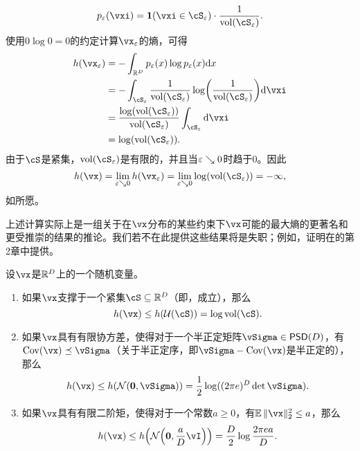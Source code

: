 \documentclass[../../book-main_zh.tex]{subfiles}
\begin{document}
\begin{equation}
    p_{\eps}(\vxi) = \indvar(\vxi \in \cS_{\eps}) \cdot \frac{1}{\volume(\cS_{\eps})}.
\end{equation}
使用\(0 \log 0 = 0\)的约定计算\(\vx_{\eps}\)的熵，可得
\begin{align}
    h(\vx_{\eps}) 
    &= -\int_{\R^{D}}p_{\eps}(x)\log p_{\eps}(x)\odif{x} \\ 
    &= -\int_{\cS_{\eps}}\frac{1}{\volume(\cS_{\eps})} \log\rp{\frac{1}{\volume(\cS_{\eps})}}\odif{\vxi} \\ 
    &= \frac{\log(\volume(\cS_{\eps}))}{\volume(\cS_{\eps})}\int_{\cS_{\eps}}\odif{\vxi} \\ 
    &= \log(\volume(\cS_{\eps})).
\end{align}
由于\(\cS\)是紧集，\(\volume(\cS_{\eps})\)是有限的，并且当\(\varepsilon \searrow 0\)时趋于\(0\)。因此
\begin{equation}
    h(\vx) = \lim_{\eps \searrow 0}h(\vx_{\eps}) = \lim_{\eps \searrow 0}\log(\volume(\cS_{\eps})) = -\infty,
\end{equation}
如所愿。

上述计算实际上是一组关于在\(\vx\)分布的某些约束下\(\vx\)可能的最大熵的更著名和更受推崇的结果的推论。我们若不在此提供这些结果将是失职；例如，证明在\cite{poliyanski2024information}的第2章中提供。
\begin{theorem}\label{thm:max_entropy}
    设\(\vx\)是\(\mathbb{R}^{D}\)上的一个随机变量。
    \begin{enumerate}
        \item 如果\(\vx\)支撑于一个紧集\(\cS \subseteq \R^{D}\)（即，成立），那么
        \begin{equation}
            h(\vx) \leq h(\dUnif(\cS)) = \log \volume(\cS).
        \end{equation}
        \item 如果\(\vx\)具有有限协方差，使得对于一个半正定矩阵\(\vSigma \in \PSD(D)\)，有\(\Cov(\vx) \preceq \vSigma\)（关于半正定序，即\(\vSigma - \Cov(\vx)\)是半正定的），那么
        \begin{equation}
            h(\vx) \leq h(\dNorm(\vzero, \vSigma)) = \frac{1}{2}\log((2\pi e)^{D}\det\vSigma).
        \end{equation}
        \item 如果\(\vx\)具有有限二阶矩，使得对于一个常数\(a \geq 0\)，有\(\Ex\norm{\vx}_{2}^{2} \leq a\)，那么
        \begin{equation}
            h(\vx) \leq h\rp{\dNorm\rp{\vzero, \frac{a}{D}\vI}} = \frac{D}{2}\log\frac{2\pi e a}{D}.
        \end{equation}
    \end{enumerate}
\end{theorem}
\end{document}
